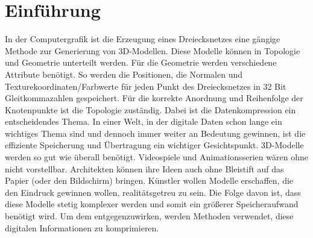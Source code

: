\section{Einführung}

In der Computergrafik ist die Erzeugung eines Dreiecksnetzes eine gängige Methode zur Generierung von 3D-Modellen. Diese Modelle können in Topologie und Geometrie unterteilt werden. Für die Geometrie werden verschiedene Attribute benötigt. 
So werden die Positionen, die Normalen und Texturekoordinaten/Farbwerte für jeden Punkt des Dreiecksnetzes in 32 Bit Gleitkommazahlen gespeichert. 
Für die korrekte Anordnung und Reihenfolge der Knotenpunkte ist die Topologie zuständig. 
Dabei ist die Datenkompression ein entscheidendes Thema. 
In einer Welt, in der digitale Daten schon lange ein wichtiges Thema sind und dennoch immer weiter an Bedeutung gewinnen, ist die effiziente Speicherung und Übertragung ein wichtiger Gesichtspunkt.
3D-Modelle werden so gut wie überall benötigt. 
Videospiele und Animationsserien wären ohne nicht vorstellbar. 
Architekten können ihre Ideen auch ohne Bleistift auf das Papier (oder den Bildschirm) bringen.
Künstler wollen Modelle erschaffen, die den Eindruck gewinnen wollen, realitätsgetreu zu sein. 
Die Folge davon ist, dass diese Modelle stetig komplexer werden und somit ein größerer Speicheraufwand benötigt wird. 
Um dem entgegenzuwirken, werden Methoden verwendet, diese digitalen Informationen zu komprimieren.

